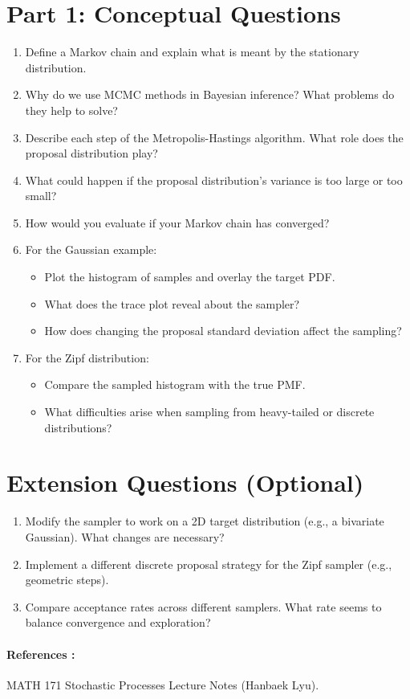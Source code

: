 \documentclass[12pt]{article}
\begin{document}
	\section*{Part 1: Conceptual Questions}
	
	\begin{enumerate}[label=\textbf{Q\arabic*.}]
		\item Define a Markov chain and explain what is meant by the stationary distribution.
		
		\item Why do we use MCMC methods in Bayesian inference? What problems do they help to solve?
		
		\item Describe each step of the Metropolis-Hastings algorithm. What role does the proposal distribution play?
		
		\item What could happen if the proposal distribution’s variance is too large or too small?
		
		\item How would you evaluate if your Markov chain has converged?
		
		\item For the Gaussian example:
		\begin{itemize}
			\item Plot the histogram of samples and overlay the target PDF.
			\item What does the trace plot reveal about the sampler?
			\item How does changing the proposal standard deviation affect the sampling?
		\end{itemize}
		
		\item For the Zipf distribution:
		\begin{itemize}
			\item Compare the sampled histogram with the true PMF.
			\item What difficulties arise when sampling from heavy-tailed or discrete distributions?
		\end{itemize}
	\end{enumerate}
	
	\section*{Extension Questions (Optional)}
	
	\begin{enumerate}[label=\textbf{E\arabic*.}]
		\item Modify the sampler to work on a 2D target distribution (e.g., a bivariate Gaussian). What changes are necessary?
		\item Implement a different discrete proposal strategy for the Zipf sampler (e.g., geometric steps).
		\item Compare acceptance rates across different samplers. What rate seems to balance convergence and exploration?
	\end{enumerate}
	
	\paragraph{References :} MATH 171 Stochastic Processes Lecture Notes (Hanbaek Lyu).
\end{document}
